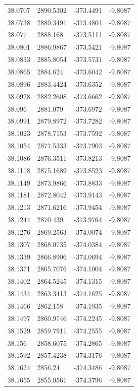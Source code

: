 \begin{table}[H]
\begin{tabular}{llll}
38.0707 & 2890.5302 & -373.4491 & -9.8087 \\
38.0738 & 2889.3491 & -373.4801 & -9.8087 \\
38.077 & 2888.168 & -373.5111 & -9.8087 \\
38.0801 & 2886.9867 & -373.5421 & -9.8087 \\
38.0833 & 2885.8054 & -373.5731 & -9.8087 \\
38.0865 & 2884.624 & -373.6042 & -9.8087 \\
38.0896 & 2883.4424 & -373.6352 & -9.8087 \\
38.0928 & 2882.2608 & -373.6662 & -9.8087 \\
38.096 & 2881.079 & -373.6972 & -9.8087 \\
38.0991 & 2879.8972 & -373.7282 & -9.8087 \\
38.1023 & 2878.7153 & -373.7592 & -9.8087 \\
38.1054 & 2877.5333 & -373.7903 & -9.8087 \\
38.1086 & 2876.3511 & -373.8213 & -9.8087 \\
38.1118 & 2875.1689 & -373.8523 & -9.8087 \\
38.1149 & 2873.9866 & -373.8833 & -9.8087 \\
38.1181 & 2872.8042 & -373.9143 & -9.8087 \\
38.1213 & 2871.6216 & -373.9454 & -9.8087 \\
38.1244 & 2870.439 & -373.9764 & -9.8087 \\
38.1276 & 2869.2563 & -374.0074 & -9.8087 \\
38.1307 & 2868.0735 & -374.0384 & -9.8087 \\
38.1339 & 2866.8906 & -374.0694 & -9.8087 \\
38.1371 & 2865.7076 & -374.1004 & -9.8087 \\
38.1402 & 2864.5245 & -374.1315 & -9.8087 \\
38.1434 & 2863.3413 & -374.1625 & -9.8087 \\
38.1466 & 2862.158 & -374.1935 & -9.8087 \\
38.1497 & 2860.9746 & -374.2245 & -9.8087 \\
38.1529 & 2859.7911 & -374.2555 & -9.8087 \\
38.156 & 2858.6075 & -374.2865 & -9.8087 \\
38.1592 & 2857.4238 & -374.3176 & -9.8087 \\
38.1624 & 2856.24 & -374.3486 & -9.8087 \\
38.1655 & 2855.0561 & -374.3796 & -9.8087 \\

\end{tabular}
\end{table}
